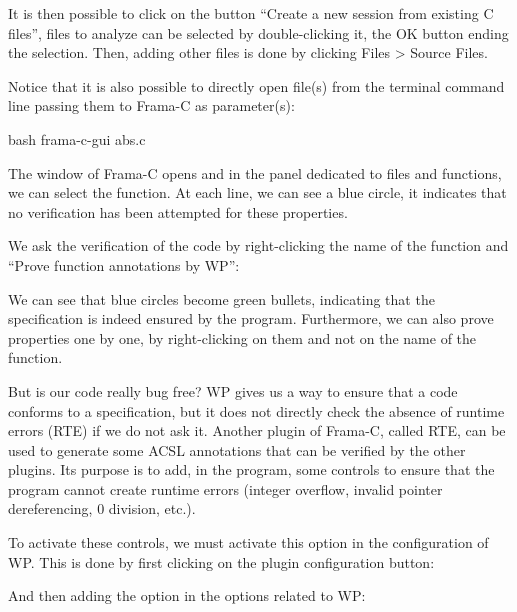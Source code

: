 It is then possible to click on the button ``Create a new session from
existing C files'', files to analyze can be selected by double-clicking
it, the OK button ending the selection. Then, adding other files is
done by clicking Files > Source Files.



Notice that it is also possible to directly open file(s) from the
terminal command line passing them to Frama-C as parameter(s):



\begin{CodeBlock}{bash}
frama-c-gui abs.c
\end{CodeBlock}





The window of Frama-C opens and in the panel dedicated to files and
functions, we can select the  function. At each
 line, we can see a blue circle, it indicates that no
verification has been attempted for these properties.



We ask the verification of the code by right-clicking the name of the
function and ``Prove function annotations by WP'':





We can see that blue circles become green bullets, indicating that the
specification is indeed ensured by the program. Furthermore, we can also prove
properties one by one, by right-clicking on them and not on the name of
the function.



But is our code really bug free? WP gives us a way to ensure that a code
conforms to a specification, but it does not directly check the absence
of runtime errors (RTE) if we do not ask it. Another plugin of Frama-C,
called RTE, can be used to generate some ACSL annotations that can be verified
by the other plugins. Its purpose is to add, in the program, some controls to
ensure that the program cannot create runtime errors (integer overflow,
invalid pointer dereferencing, 0 division, etc.).



To activate these controls, we must activate this option in the configuration
of WP. This is done by first clicking on the plugin configuration button:




And then adding the option  in the options related to WP:


